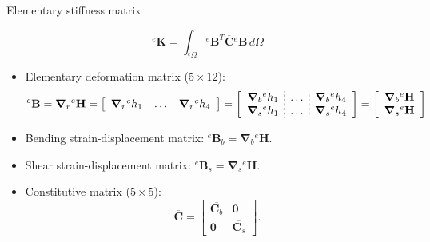 \documentclass[aspectratio=169]{beamer}
\begin{document}
\begin{frame}{Elementary stiffness matrix}
  \begin{block}{}
    $${}^e\mathbf K=\int_{{}^e\Omega} {}^e\mathbf B^T\overline{\mathbf C}{}^e\mathbf B \, d\Omega$$
  \end{block}
  \begin{itemize}
    \item Elementary deformation matrix ($5\times 12$):
          $${}^e\mathbf B=\boldsymbol\nabla_r {}^e\mathbf H=\left[
              \begin{array}{c;{2pt/2pt}c;{2pt/2pt}c}
                \boldsymbol\nabla_r {}^eh_1 & \dots & \boldsymbol\nabla_r {}^eh_{4}
              \end{array} \right]=\left[
              \begin{array}{c;{2pt/2pt}c;{2pt/2pt}c}
                \boldsymbol\nabla_b {}^eh_1 & \dots & \boldsymbol\nabla_b {}^eh_{4} \\
                \boldsymbol\nabla_s {}^eh_1 & \dots & \boldsymbol\nabla_s {}^eh_{4} \\
              \end{array} \right]=\left[
              \begin{array}{c}
                \boldsymbol\nabla_b {}^e\mathbf H \\
                \boldsymbol\nabla_s {}^e\mathbf H \\
              \end{array} \right]$$
  \end{itemize}
  \begin{block}{}
    \vspace{0.2cm}
    \begin{itemize}
      \item Bending strain-displacement matrix:
            ${}^e\mathbf B_b=\boldsymbol\nabla_b {}^e\mathbf H$.
      \item Shear strain-displacement matrix:
            ${}^e\mathbf B_s=\boldsymbol\nabla_s {}^e\mathbf H$.
            \vspace{0.2cm}
    \end{itemize}
  \end{block}
  \begin{itemize}
    \item Constitutive matrix ($5\times 5$):
          $$\overline{\boldsymbol{C}}=\begin{bmatrix}
              \overline{\boldsymbol{C}_b} & \mathbf 0                   \\
              \mathbf 0                   & \overline{\boldsymbol{C}_s}
            \end{bmatrix}.$$
  \end{itemize}
\end{frame}
\end{document}

